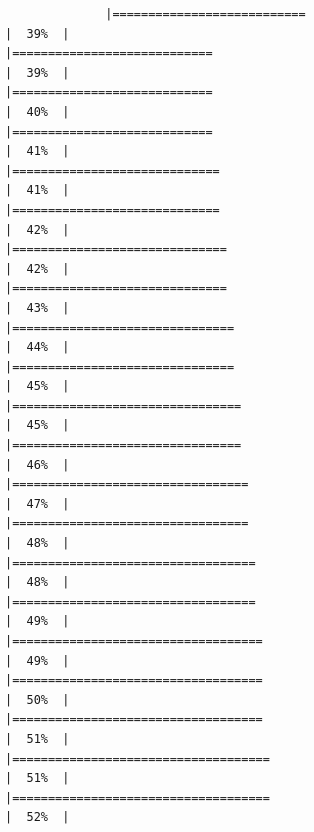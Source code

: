 \documentclass[
]{article}
\begin{document}
\begin{verbatim}
              |===========================                                           |  39%  |                                                                              |============================                                          |  39%  |                                                                              |============================                                          |  40%  |                                                                              |============================                                          |  41%  |                                                                              |=============================                                         |  41%  |                                                                              |=============================                                         |  42%  |                                                                              |==============================                                        |  42%  |                                                                              |==============================                                        |  43%  |                                                                              |===============================                                       |  44%  |                                                                              |===============================                                       |  45%  |                                                                              |================================                                      |  45%  |                                                                              |================================                                      |  46%  |                                                                              |=================================                                     |  47%  |                                                                              |=================================                                     |  48%  |                                                                              |==================================                                    |  48%  |                                                                              |==================================                                    |  49%  |                                                                              |===================================                                   |  49%  |                                                                              |===================================                                   |  50%  |                                                                              |===================================                                   |  51%  |                                                                              |====================================                                  |  51%  |                                                                              |====================================                                  |  52%  |                                                                 
\end{verbatim}
\end{document}
